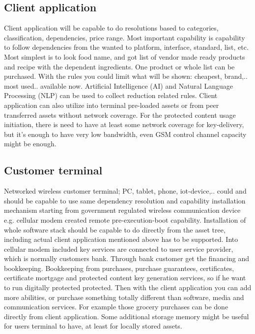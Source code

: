 \subsection{Client application}
\label{client_application}

Client application will be capable to do resolutions based to categories, classification, dependencies, price range. Most important capability is capability to follow dependencies from the wanted to platform, interface, standard, list, etc. Most simplest is to look food name, and got list of vendor made ready products and recipe with the dependent ingredients. One product or whole list can be purchased. With the rules you could limit what will be shown: cheapest, brand,.. most used.. available now. Artificial Intelligence (AI) and Natural Language Processing (NLP) can be used to collect reduction related rules. Client application can also utilize into terminal pre-loaded assets or from peer transferred assets without network coverage. For the protected content usage initiation, there is need to have at least some network coverage for key-delivery, but it's enough to have very low bandwidth, even GSM control channel capacity might be enough.

\subsection{Customer terminal}
\label{customer_terminal}

Networked wireless customer terminal; PC, tablet, phone, iot-device,.. could and should be capable to use same dependency resolution and capability installation mechanism starting from government regulated wireless communication device e.g. cellular modem created remote pre-execution-boot capability. Installation of whole software stack should be capable to do directly from the asset tree, including actual client application mentioned above has to be supported. Into cellular modem included key services are connected to user service provider, which is normally customers bank. Through bank customer get the financing and bookkeeping. Bookkeeping from purchases, purchase guarantees, certificates, certificate mortgage and protected content key generation services, so if he want to run digitally protected protected. Then with the client application you can add more abilities, or purchase something totally different than software, media and communication services.  For example those grocery purchases can be done directly from client application. Some additional storage memory might be useful for users terminal to have, at least for locally stored assets.

